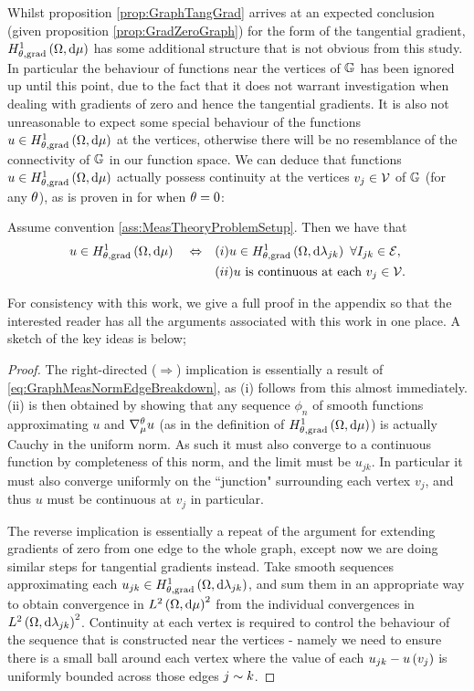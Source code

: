 Whilst proposition \ref{prop:GraphTangGrad} arrives at an expected conclusion (given proposition \ref{prop:GradZeroGraph}) for the form of the tangential gradient, $H^1_{\theta, \mathrm{grad}}\left( \Omega, \mathrm{d}\mu \right)$ has some additional structure that is not obvious from this study.
In particular the behaviour of functions near the vertices of $\mathbb{G}$ has been ignored up until this point, due to the fact that it does not warrant investigation when dealing with gradients of zero and hence the tangential gradients.
It is also not unreasonable to expect some special behaviour of the functions $u\in H^1_{\theta, \mathrm{grad}}\left( \Omega, \mathrm{d}\mu \right)$ at the vertices, otherwise there will be no resemblance of the connectivity of $\mathbb{G}$ in our function space.
We can deduce that functions $u\in H^1_{\theta, \mathrm{grad}}\left( \Omega, \mathrm{d}\mu \right)$ actually possess continuity at the vertices $v_j\in \mathcal{V}$ of $\mathbb{G}$ (for any $\theta$), as is proven in  for when $\theta=0$:
\begin{theorem} \label{thm:CharOfGradSob}
	Assume convention \ref{ass:MeasTheoryProblemSetup}.
	Then we have that
	\begin{align*}
		u\in H^1_{\theta, \mathrm{grad}}\left( \Omega, \mathrm{d}\mu \right) \quad\Leftrightarrow\quad 
		& (i) u\in H^1_{\theta, \mathrm{grad}}\left( \Omega, \mathrm{d}\lambda_{jk} \right) \ \forall I_{jk}\in \mathcal{E}, \\
		& (ii) u \text{ is continuous at each } v_j\in \mathcal{V}.
	\end{align*}
\end{theorem}
For consistency with this work, we give a full proof in the appendix so that the interested reader has all the arguments associated with this work in one place.
A sketch of the key ideas is below;
\begin{proof}
	The right-directed ($\Rightarrow$) implication is essentially a result of \eqref{eq:GraphMeasNormEdgeBreakdown}, as (i) follows from this almost immediately.
	(ii) is then obtained by showing that any sequence $\phi_n$ of smooth functions approximating $u$ and $\nabla^{\theta}_\mu u$ (as in the definition of $H^1_{\theta, \mathrm{grad}}\left( \Omega, \mathrm{d}\mu \right)$) is actually Cauchy in the uniform norm.
	As such it must also converge to a continuous function by completeness of this norm, and the limit must be $u_{jk}$.
	In particular it must also converge uniformly on the ``junction" surrounding each vertex $v_j$, and thus $u$ must be continuous at $v_j$ in particular. \newline
	
	The reverse implication is essentially a repeat of the argument for extending gradients of zero from one edge to the whole graph, except now we are doing similar steps for tangential gradients instead.
	Take smooth sequences approximating each $u_{jk}\in H^1_{\theta, \mathrm{grad}}\left( \Omega, \mathrm{d}\lambda_{jk} \right)$, and sum them in an appropriate way to obtain convergence in $L^{2}\left( \Omega,\mathrm{d}\mu \right)^2$ from the individual convergences in $L^{2}\left( \Omega,\mathrm{d}\lambda_{jk} \right)^2$.
	Continuity at each vertex is required to control the behaviour of the sequence that is constructed near the vertices - namely we need to ensure there is a small ball around each vertex where the value of each $u_{jk} - u\left( v_j \right)$ is uniformly bounded across those edges $j\sim k$.
\end{proof}

